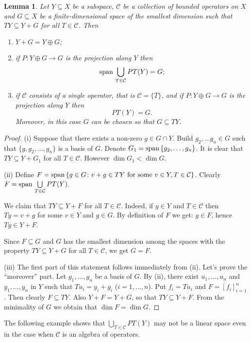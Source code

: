 \documentclass[12pt]{amsart}
\theoremstyle{plain}
\newtheorem{lemma}[theorem]{Lemma}
\theoremstyle{definition}
\theoremstyle{remark}
\begin{document}
\begin{lemma}\label{char-min-dim}
Let $Y\subseteq X$ be a subspace, $\mathcal C$ be a collection of bounded 
operators on $X$ and $G\subseteq X$ be a finite-dimensional space of the 
smallest dimension such that $TY\subseteq Y+G$ for all $T\in\mathcal C$. Then
\begin{enumerate}
	\item $Y+G=Y\oplus G$;
	\item if $P:Y\oplus G\to G$ is the projection along $Y$ then 
	      $${{\rm span}\,}\bigcup\limits_{T\in\mathcal C}PT(Y)=G;$$
	\item if $\mathcal C$ consists of a single operator, that is $\mathcal C=\{T\}$, and if $P:Y\oplus G\to G$ is the projection along $Y$ then 
	      $$PT(Y)=G.$$
Moreover, in this case $G$ can be chosen so that $G\subseteq TY$.	      
\end{enumerate}
\end{lemma}
\begin{proof}
(i) Suppose that there exists a non-zero $g\in G\cap Y$. Build $g_2,\dots 
g_n\in G$ such that $\{g,g_2,\dots, g_n\}$ is a basis of $G$. Denote 
$G_1 = {{\rm span}\,}\{g_2,\dots,g_n\}$. It is clear that $TY\subseteq Y+G_1$ for all 
$T\in\mathcal C$. However $\dim G_1<\dim G$.

(ii) Define $F={{\rm span}\,}\{g\in G\colon v+g\in TY\mbox{ for some }v\in Y, T\in\mathcal C\}$. Clearly $F={{\rm span}\,}\bigcup\limits_{T\in\mathcal C}PT(Y)$.

We claim that $TY\subseteq Y+F$ for all $T\in\mathcal C$. Indeed, if 
$y\in Y$ and $T\in\mathcal C$ then $Ty=v+g$ for some $v\in Y$ and $g\in G$. By 
definition of $F$ we get: $g\in F$, hence $Ty\in Y+F$. 

Since $F\subseteq G$ and $G$ has the smallest dimension among the spaces with 
the property $TY\subseteq Y+G$ for all $T\in\mathcal C$, we get $G=F$.

(iii) The first part of this statement follows immediately from (ii). Let's prove the ``moreover'' part. Let $g_1,\dots,g_n$ be a basis of $G$. By (ii), there exist $u_1,\dots,u_n$ and $y_1,\dots,y_n$ in $Y$ such that $Tu_i=y_i+g_i$ ($i=1,\dots,n$). Put $f_i=Tu_i$ and $F=[f_i]_{i=1}^n$. Then clearly $F\subseteq TY$. Also $Y+F=Y+G$, so that $TY\subseteq Y+F$. From the minimality of $G$ we obtain that $\dim F=\dim G$.
\end{proof}

The following example shows that $\bigcup\limits_{T\in\mathcal C}PT(Y)$ may not be a linear space even in the case when $\mathcal C$ is an algebra of operators. 
\end{document}
